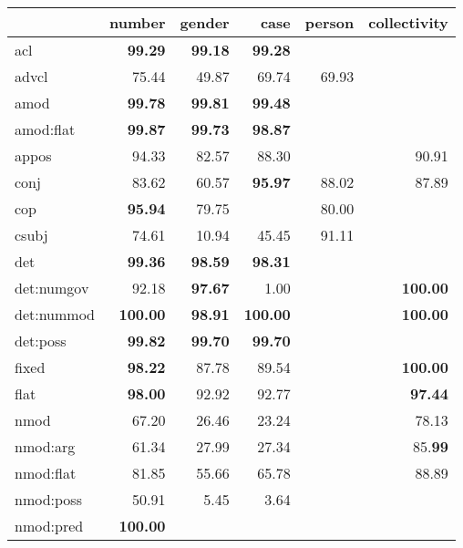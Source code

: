 \documentclass[12pt]{article}
\begin{document}
\begin{table}[H]
\centering
\begin{tabular}{lrrrrr}
\centering
{} &  number &  gender &    case &  person &  collectivity \\
\midrule
acl         &   \textbf{99.29} &   \textbf{99.18} &   \textbf{99.28} &         &               \\  
advcl       &   75.44 &   49.87 &   69.74 &   69.93 &               \\  
amod        &   \textbf{99.78} &   \textbf{99.81} &   \textbf{99.48} &         &               \\  
amod:flat   &   \textbf{99.87} &   \textbf{99.73} &   \textbf{98.87} &         &               \\  
appos       &   94.33 &   82.57 &   88.30 &         &         90.91 \\
conj        &   83.62 &   60.57 &   \textbf{95.97} &   88.02 &         87.89 \\
cop         &   \textbf{95.94} &   79.75 &         &   80.00 &               \\  
csubj       &   74.61 &   10.94 &   45.45 &   91.11 &               \\  
det         &   \textbf{99.36} &   \textbf{98.59} &   \textbf{98.31} &         &               \\  
det:numgov  &   92.18 &   \textbf{97.67} &    1.00 &         &        \textbf{100.00} \\
det:nummod  &  \textbf{100.00} &   \textbf{98.91} &  \textbf{100.00} &         &        \textbf{100.00} \\
det:poss    &   \textbf{99.82} &   \textbf{99.70} &   \textbf{99.70} &         &               \\  
fixed       &   \textbf{98.22} &   87.78 &   89.54 &         &        \textbf{100.00} \\
flat        &   \textbf{98.00} &   92.92 &   92.77 &         &         \textbf{97.44} \\
nmod        &   67.20 &   26.46 &   23.24 &         &         78.13 \\
nmod:arg    &   61.34 &   27.99 &   27.34 &         &         85.\textbf{99} \\
nmod:flat   &   81.85 &   55.66 &   65.78 &         &         88.89 \\
nmod:poss   &   50.91 &    5.45 &    3.64 &         &               \\  
nmod:pred   &  \textbf{100.00} &         &         &         &               \\  

\end{tabular}
\end{table}
\end{document}
